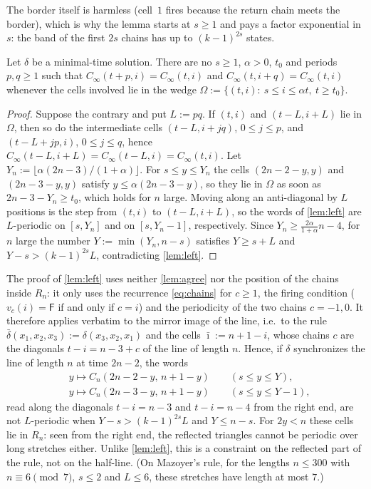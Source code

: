 The border itself is harmless (cell~$1$ fires because the return chain
meets the border), which is why the lemma starts at $s\ge1$ and pays a
factor exponential in $s$: the band of the first $2s$ chains has up to
$(k-1)^{2s}$ states.

\begin{theorem}\label{thm:left}
Let $\delta$ be a minimal-time solution. There are no $s\ge1$, $\alpha>0$,
$t_0$ and periods $p,q\ge1$ such that $C_\infty(t+p,i)=C_\infty(t,i)$ and
$C_\infty(t,i+q)=C_\infty(t,i)$ whenever the cells involved lie in the wedge
$\Omega:=\{(t,i):\ s\le i\le\alpha t,\ t\ge t_0\}$.
\end{theorem}

\begin{proof}
Suppose the contrary and put $L:=pq$. If $(t,i)$ and $(t-L,i+L)$ lie in
$\Omega$, then so do the intermediate cells $(t-L,i+jq)$, $0\le j\le p$,
and $(t-L+jp,i)$, $0\le j\le q$, hence
$C_\infty(t-L,i+L)=C_\infty(t-L,i)=C_\infty(t,i)$. Let
$Y_n:=\lfloor\alpha(2n-3)/(1+\alpha)\rfloor$. For $s\le y\le Y_n$ the cells
$(2n-2-y,y)$ and $(2n-3-y,y)$ satisfy $y\le\alpha(2n-3-y)$, so they lie in
$\Omega$ as soon as $2n-3-Y_n\ge t_0$, which holds for $n$ large. Moving
along an anti-diagonal by $L$ positions is the step from $(t,i)$ to
$(t-L,i+L)$, so the words of \cref{lem:left} are $L$-periodic on $[s,Y_n]$
and on $[s,Y_n-1]$, respectively. Since $Y_n\ge\frac{2\alpha}{1+\alpha}n-4$,
for $n$ large the number $Y:=\min(Y_n,n-s)$ satisfies $Y\ge s+L$ and
$Y-s>(k-1)^{2s}L$, contradicting \cref{lem:left}.
\end{proof}

\begin{remark}\label{rem:right}
The proof of \cref{lem:left} uses neither \cref{lem:agree} nor the position
of the chains inside $R_n$: it only uses the recurrence \eqref{eq:chains}
for $c\ge1$, the firing condition ($v_c(i)=\mathsf F$ if and only if $c=i$)
and the periodicity of the two chains $c=-1,0$. It therefore applies
verbatim to the mirror image of the line, i.e.\ to the rule
$\bar\delta(x_1,x_2,x_3):=\delta(x_3,x_2,x_1)$ and the cells $\bar\imath:=n+1-i$, whose
chains $c$ are the diagonals $t-i=n-3+c$ of the line of length $n$. Hence,
if $\delta$ synchronizes the line of length $n$ at time $2n-2$, the words
\begin{align*}
&y\mapsto C_n(2n-2-y,\,n+1-y)\qquad(s\le y\le Y),\\
&y\mapsto C_n(2n-3-y,\,n+1-y)\qquad(s\le y\le Y-1),
\end{align*}
read along the diagonals $t-i=n-3$ and $t-i=n-4$ from the right end, are
not $L$-periodic when $Y-s>(k-1)^{2s}L$ and $Y\le n-s$. For $2y<n$
these cells lie in $R_n$: seen from the right end, the reflected triangles
cannot be periodic over long stretches either. Unlike \cref{lem:left},
this is a constraint on the reflected part of the rule, not on the
half-line. (On Mazoyer's rule, for the lengths $n\le300$ with $n\equiv6
\pmod 7$, $s\le2$ and $L\le6$, these stretches have length at most $7$.)
\end{remark}

